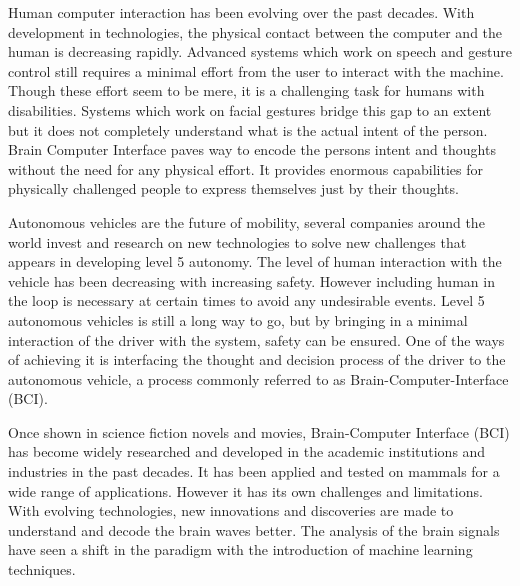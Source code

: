 Human computer interaction has been evolving over the past decades. With development in technologies, the physical contact between the computer and the human is decreasing rapidly. Advanced systems which work on speech and gesture control still requires a minimal effort from the user to interact with the machine. Though these effort seem to be mere, it is a challenging task for humans with disabilities. Systems which work on facial gestures bridge this gap to an extent but it does not completely understand what is the actual intent of the person. Brain Computer Interface paves way to encode the persons intent and thoughts without the need for any physical effort. It provides enormous capabilities for physically challenged people to express themselves just by their thoughts. 

Autonomous vehicles are the future of mobility, several companies around the world invest and research on new technologies to solve new challenges that appears in developing level 5 autonomy. The level of human interaction with the vehicle has been decreasing with increasing safety. However including human in the loop is necessary at certain times to avoid any undesirable events. Level 5 autonomous vehicles is still a long way to go, but by bringing in a minimal interaction of the driver with the system, safety can be ensured. One of the ways of achieving it is interfacing the thought and decision process of the driver to the autonomous vehicle, a process commonly referred to as Brain-Computer-Interface (BCI). 

Once shown in science fiction novels and movies, Brain-Computer Interface (BCI) has become widely researched and developed in the academic institutions and industries in the past decades. It has been applied and tested on mammals for a wide range of applications. However it has its own challenges and limitations. With evolving technologies, new innovations and discoveries are made to understand and decode the brain waves better. The analysis of the brain signals have seen a shift in the paradigm with the introduction of machine learning techniques. 

